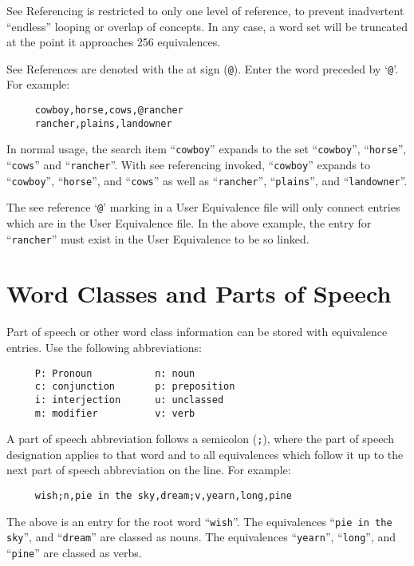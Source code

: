 See Referencing is restricted to only one level of reference, to
prevent inadvertent ``endless'' looping or overlap of concepts.  In
any case, a word set will be truncated at the point it approaches 256
equivalences.

See References are denoted with the at sign (\verb`@`).  Enter the
word preceded by `\verb`@`'.  For example:

\begin{verbatim}
     cowboy,horse,cows,@rancher
     rancher,plains,landowner
\end{verbatim}

In normal usage, the search item ``\verb`cowboy`'' expands to the set
``\verb`cowboy`'', ``\verb`horse`'', ``\verb`cows`'' and
``\verb`rancher`''.  With see referencing invoked, ``\verb`cowboy`''
expands to ``\verb`cowboy`'', ``\verb`horse`'', and ``\verb`cows`'' as
well as ``\verb`rancher`'', ``\verb`plains`'', and
``\verb`landowner`''.

The see reference `\verb`@`' marking in a User Equivalence file will
only connect entries which are in the User Equivalence file.  In the
above example, the entry for ``\verb`rancher`'' must exist in the User
Equivalence to be so linked.


\section{Word Classes and Parts of Speech}

Part of speech or other word class information can be stored with
equivalence entries.  Use the following abbreviations:

\begin{verbatim}
     P: Pronoun           n: noun
     c: conjunction       p: preposition
     i: interjection      u: unclassed
     m: modifier          v: verb
\end{verbatim}

A part of speech abbreviation follows a semicolon (\verb`;`), where
the part of speech designation applies to that word and to all
equivalences which follow it up to the next part of speech
abbreviation on the line.  For example:

\begin{verbatim}
     wish;n,pie in the sky,dream;v,yearn,long,pine
\end{verbatim}

The above is an entry for the root word ``\verb`wish`''.  The
equivalences ``\verb`pie in the sky`'', and ``\verb`dream`'' are
classed as nouns.  The equivalences ``\verb`yearn`'', ``\verb`long`'',
and ``\verb`pine`'' are classed as verbs.


